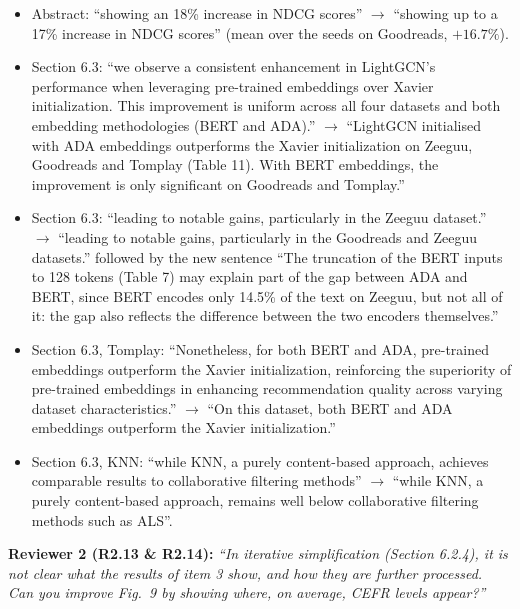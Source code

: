 \documentclass[11pt,a4paper]{article}
\newenvironment{mmblock}{}{}
\newcommand{\mmhl}[1]{#1}
\newcommand{\mmhll}[1]{#1}
\begin{document}
\begin{mmblock}
\begin{itemize}
    \item Abstract: ``showing an 18\% increase in NDCG scores'' $\rightarrow$ ``showing \mmhl{up to a 17}\% increase in NDCG scores'' (mean over the seeds on Goodreads, $+16.7\%$).
    \item Section 6.3: ``we observe a consistent enhancement in LightGCN's performance when leveraging pre-trained embeddings over Xavier initialization. This improvement is uniform across all four datasets and both embedding methodologies (BERT and ADA).'' $\rightarrow$ ``\mmhll{LightGCN initialised with ADA embeddings outperforms the Xavier initialization on Zeeguu, Goodreads and Tomplay (Table 11). With BERT embeddings, the improvement is only significant on Goodreads and Tomplay.}''
    \item Section 6.3: ``leading to notable gains, particularly in the Zeeguu dataset.'' $\rightarrow$ ``leading to notable gains, particularly in the \mmhl{Goodreads and} Zeeguu dataset\mmhl{s}.'' followed by the new sentence ``\mmhll{The truncation of the BERT inputs to 128 tokens (Table 7) may explain part of the gap between ADA and BERT, since BERT encodes only 14.5\% of the text on Zeeguu, but not all of it: the gap also reflects the difference between the two encoders themselves.}''
    \item Section 6.3, Tomplay: ``Nonetheless, for both BERT and ADA, pre-trained embeddings outperform the Xavier initialization, reinforcing the superiority of pre-trained embeddings in enhancing recommendation quality across varying dataset characteristics.'' $\rightarrow$ ``\mmhll{On this dataset, both BERT and ADA embeddings outperform the Xavier initialization.}''
    \item Section 6.3, KNN: ``while KNN, a purely content-based approach, achieves comparable results to collaborative filtering methods'' $\rightarrow$ ``while KNN, a purely content-based approach, \mmhll{remains well below collaborative filtering methods such as ALS}''.
\end{itemize}
\end{mmblock}

\begin{reviewbox}
\textbf{Reviewer 2 (R2.13 \& R2.14):} \textit{``In iterative simplification (Section 6.2.4), it is not clear what the results of item 3 show, and how they are further processed. Can you improve Fig.\ 9 by showing where, on average, CEFR levels appear?''}
\end{reviewbox}
\end{document}
